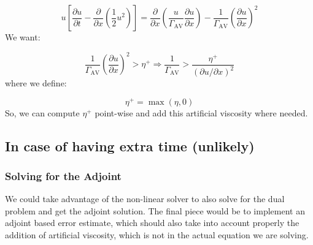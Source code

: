\documentclass[10pt,a4paper]{article}
\begin{document}
\begin{equation}
    u
    \left[
    \dfrac{\partial u}{\partial t}
    -
    \dfrac{\partial}{\partial x}\left(\dfrac{1}{2}u^2\right)
    \right]
    =
    \dfrac{\partial}{\partial x}\left(\dfrac{u}{\Gamma_\text{AV}} \dfrac{\partial u}{\partial x}\right) - \dfrac{1}{\Gamma_\text{AV}}\left(\dfrac{\partial u}{\partial x}\right)^2
\end{equation}
We want:

\begin{equation}
    \dfrac{1}{\Gamma_\text{AV}}\left(\dfrac{\partial u}{\partial x}\right)^2
    >
    \eta^{+}
    \Rightarrow
    \dfrac{1}{\Gamma_\text{AV}}
    >\dfrac{\eta^+}{(\partial u/\partial x)^2}
    \label{e:gamma_condition}
\end{equation}
where we define:

\begin{equation}
	\eta^+ = \max(\eta,0)
\end{equation}
So, we can compute $\eta^+$ point-wise and add this artificial viscosity where needed.

\subsection*{In case of having extra time (unlikely)}

\subsubsection*{Solving for the Adjoint}

We could take advantage of the non-linear solver to also solve for 
the dual problem and get the adjoint solution. The final piece would be to implement an adjoint based error estimate, which should also take into account properly
the addition of artificial viscosity, which is not in the actual equation we are solving.
\end{document}
